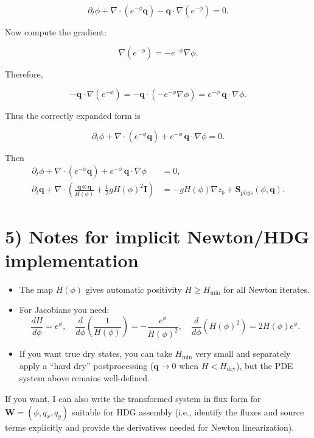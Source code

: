 \documentclass[11pt]{article}
\begin{document}
\[
\partial_t\phi
+
\nabla\cdot(e^{-\phi}\mathbf{q})
-
\mathbf{q}\cdot\nabla(e^{-\phi})
= 0.
\]

Now compute the gradient:

\[
\nabla(e^{-\phi})
=
- e^{-\phi}\nabla\phi.
\]

Therefore,

\[
-\mathbf{q}\cdot\nabla(e^{-\phi})
=
-\mathbf{q}\cdot(-e^{-\phi}\nabla\phi)
=
e^{-\phi}\,\mathbf{q}\cdot\nabla\phi.
\]

Thus the correctly expanded form is

\[
\boxed{
\partial_t\phi
+
\nabla\cdot(e^{-\phi}\mathbf{q})
+
e^{-\phi}\,\mathbf{q}\cdot\nabla\phi
= 0.
}
\]


Then
\[
\boxed{
\begin{aligned}
\partial_t\phi
+
\nabla\cdot(e^{-\phi}\mathbf{q})
+
e^{-\phi}\,\mathbf{q}\cdot\nabla\phi
& = 0,\\[4pt]
\partial_t \mathbf{q}
+\nabla\cdot\!\left(\frac{\mathbf{q}\otimes\mathbf{q}}{H(\phi)}
+\frac{1}{2}gH(\phi)^2\mathbf{I}\right)
&=-gH(\phi)\nabla z_b+\mathbf{S}_{phys}(\phi,\mathbf{q}).
\end{aligned}
}
\]


\section*{5) Notes for implicit Newton/HDG implementation}

\begin{itemize}
\item The map $H(\phi)$ gives automatic positivity $H\ge H_{\min}$ for all Newton iterates.
\item For Jacobians you need:
\[
\frac{dH}{d\phi}=e^{\phi},\quad
\frac{d}{d\phi}\left(\frac{1}{H(\phi)}\right)=-\frac{e^{\phi}}{H(\phi)^2},\quad
\frac{d}{d\phi}\left(H(\phi)^2\right)=2H(\phi)e^{\phi}.
\]
\item If you want true dry states, you can take $H_{\min}$ very small and separately apply a ``hard dry'' postprocessing ($\mathbf{q}\to 0$ when $H<H_{\text{dry}}$), but the PDE system above remains well-defined.
\end{itemize}

If you want, I can also write the transformed system in flux form for $\mathbf{W}=(\phi,q_x,q_y)$ suitable for HDG assembly (i.e., identify the fluxes and source terms explicitly and provide the derivatives needed for Newton linearization).
\end{document}
